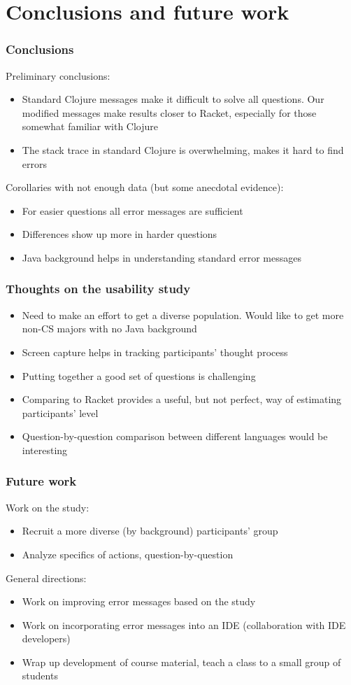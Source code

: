 \documentclass{beamer}
\begin{document}
\section{Conclusions and future work}

\frametitle{Conclusions}

\begin{frame}
Preliminary conclusions:
\begin{itemize}
\item Standard Clojure messages make it difficult to solve all questions. Our modified messages make results closer to Racket, especially for 
those somewhat familiar with Clojure
\item The stack trace in standard Clojure is overwhelming, makes it hard to find errors 
\end{itemize}
Corollaries with not enough data (but some anecdotal evidence):
\begin{itemize}
\item For easier questions all error messages are sufficient
\item Differences show up more in harder questions 
\item Java background helps in understanding standard error messages
\end{itemize}
\end{frame}

\begin{frame}
\frametitle{Thoughts on the usability study}
\begin{itemize}
\item Need to make an effort to get a diverse population. Would like to get more non-CS majors with no Java background
\item Screen capture helps in tracking participants' thought process
\item Putting together a good set of questions is challenging
\item Comparing to Racket provides a useful, but not perfect, way of estimating participants' level 
\item Question-by-question comparison between different languages would be interesting
\end{itemize}
\end{frame}

\begin{frame}
\frametitle{Future work}
Work on the study:
\begin{itemize}
\item Recruit a more diverse (by background) participants' group
\item Analyze specifics of actions, question-by-question
\end{itemize}
General directions:
\begin{itemize}
\item Work on improving error messages based on the study
\item Work on incorporating error messages into an IDE (collaboration with IDE developers)
\item Wrap up development of course material, teach a class to a small group of students 
\end{itemize}
\end{frame}
\end{document}
